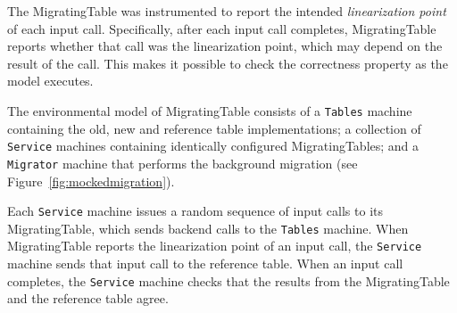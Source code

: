 
%


The MigratingTable was instrumented to report the intended \emph{linearization point} of each input call. Specifically, after each input call completes, MigratingTable reports whether that call was the linearization point, which may depend on the result of the call.  This makes it possible to check the correctness property as the model executes.

The \psharp environmental model of MigratingTable consists of a \texttt{Tables} machine containing the old, new and reference table implementations; a collection of \texttt{Service} machines containing identically configured MigratingTables; and a \texttt{Migrator} machine that performs the background migration (see Figure~\ref{fig:mockedmigration}).

Each \texttt{Service} machine issues a random sequence of input calls to its MigratingTable, which sends backend calls to the \texttt{Tables} machine. When MigratingTable reports the linearization point of an input call, the \texttt{Service} machine sends that input call to the reference table.  When an input call completes, the \texttt{Service} machine checks that the results from the MigratingTable and the reference table agree.

